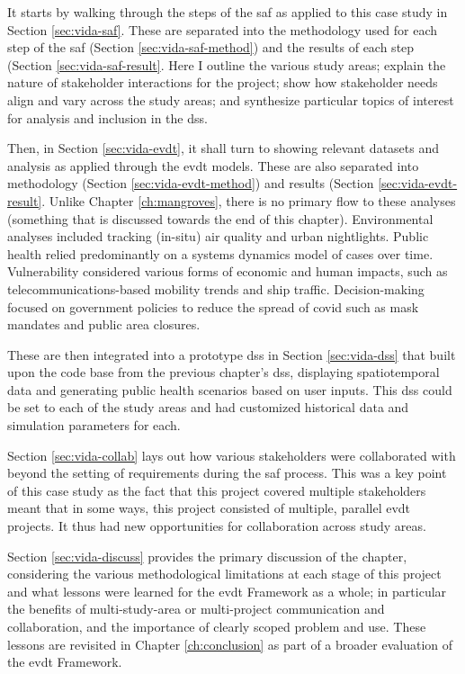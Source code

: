 It starts by walking through the steps of the \acf{saf} as applied to this case study in Section \ref{sec:vida-saf}. These are separated into the methodology used for each step of the \ac{saf} (Section \ref{sec:vida-saf-method}) and the results of each step (Section \ref{sec:vida-saf-result}. Here I outline the various study areas; explain the nature of stakeholder interactions for the project; show how stakeholder needs align and vary across the study areas; and synthesize particular topics of interest for analysis and inclusion in the \ac{dss}.

Then, in Section \ref{sec:vida-evdt}, it shall turn to showing relevant datasets and analysis as applied through the \acf{evdt} models. These are also separated into methodology (Section \ref{sec:vida-evdt-method}) and results (Section \ref{sec:vida-evdt-result}. Unlike Chapter \ref{ch:mangroves}, there is no primary flow to these analyses (something that is discussed towards the end of this chapter). Environmental analyses included tracking (in-situ) air quality and urban nightlights. Public health relied predominantly on a systems dynamics model of cases over time. Vulnerability considered various forms of economic and human impacts, such as telecommunications-based mobility trends and ship traffic. Decision-making focused on government policies to reduce the spread of \ac{covid} such as mask mandates and public area closures.

These are then integrated into a prototype \ac{dss} in Section \ref{sec:vida-dss} that built upon the code base from the previous chapter's \ac{dss}, displaying spatiotemporal data and generating public health scenarios based on user inputs. This \ac{dss} could be set to each of the study areas and had customized historical data and simulation parameters for each.

Section \ref{sec:vida-collab} lays out how various stakeholders were collaborated with beyond the setting of requirements during the \ac{saf} process. This was a key point of this case study as the fact that this project covered multiple stakeholders meant that in some ways, this project consisted of multiple, parallel \ac{evdt} projects. It thus had new opportunities for collaboration across study areas.

Section \ref{sec:vida-discuss} provides the primary discussion of the chapter, considering the various methodological limitations at each stage of this project and what lessons were learned for the \ac{evdt} Framework as a whole; in particular the benefits of multi-study-area or multi-project communication and collaboration, and the importance of clearly scoped problem and use. These lessons are revisited in Chapter \ref{ch:conclusion} as part of a broader evaluation of the \ac{evdt} Framework.

